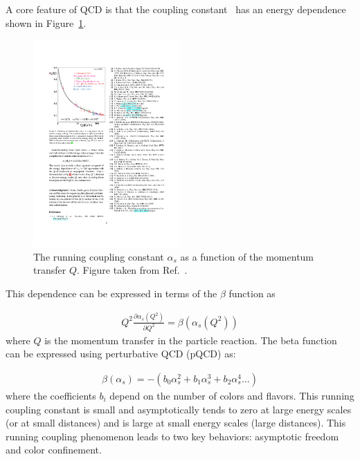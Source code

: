 A core feature of QCD is that the coupling constant \alphas\ has an energy dependence shown in Figure~\ref{fig:running_coupling}.

\begin{figure}[htbp]
\begin{center}
\includegraphics[width=0.5\textwidth]{figures/theory/running_coupling}
\caption{The running coupling constant $\alpha_s$ as a function of the momentum transfer $Q$.
Figure taken from Ref.~\cite{Beringer:1481544}.}
\label{fig:running_coupling}
\end{center}
\end{figure}

This dependence can be expressed in terms of the $\beta$ function as

\begin{align}
Q^2 \frac{\partial \alpha_s (Q^2)}{\partial Q^2} = \beta(\alpha_s (Q^2))
\end{align}
where $Q$ is the momentum transfer in the particle reaction.
The beta function can be expressed using perturbative QCD (pQCD) as:

\begin{align}
\beta( \alpha_s ) = - (b_0 \alpha_s^2 + b_1 \alpha_s^3 + b_2 \alpha_s^4...)
\end{align}
where the coefficients $b_i$ depend on the number of colors and flavors.
This running coupling constant is small and asymptotically tends to zero at large energy scales (or at small distances) and is large at small energy scales (large distances).
This running coupling phenomenon leads to two key behaviors: asymptotic freedom and color confinement.



